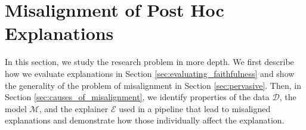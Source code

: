 \documentclass[mnsc,blindrev]{informs3}
\newcommand{\mD}{\mathcal{D}}
\newcommand{\mM}{\mathcal{M}}
\newcommand{\mE}{\mathcal{E}}
\begin{document}
     





\section{Misalignment of Post Hoc Explanations}
\label{sec:misalignment}
  In this section, we study the research problem in more depth. We first describe how we evaluate explanations in Section \ref{sec:evaluating_faithfulness} and show the generality of the problem of misalignment in Section \ref{sec:pervasive}. 
  Then, in Section \ref{sec:causes_of_misalignment}, we identify properties of the data $\mD$, the model $\mM$, and the explainer $\mE$ used in a pipeline that lead to misaligned explanations and demonstrate how those individually affect the explanation.  %
\end{document}
